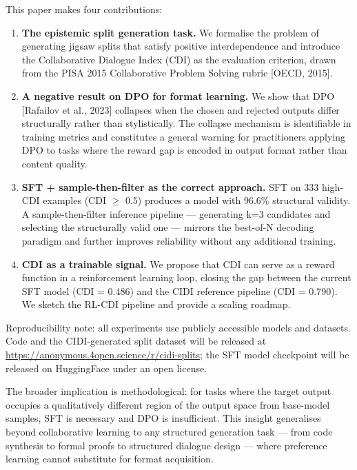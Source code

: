 \documentclass[
  11pt,
]{article}
\begin{document}
This paper makes four contributions:

\begin{enumerate}
\def\labelenumi{\arabic{enumi}.}
\item
  \textbf{The epistemic split generation task.} We formalise the problem
  of generating jigsaw splits that satisfy positive interdependence and
  introduce the Collaborative Dialogue Index (CDI) as the evaluation
  criterion, drawn from the PISA 2015 Collaborative Problem Solving
  rubric {[}OECD, 2015{]}.
\item
  \textbf{A negative result on DPO for format learning.} We show that
  DPO {[}Rafailov et al., 2023{]} collapses when the chosen and rejected
  outputs differ structurally rather than stylistically. The collapse
  mechanism is identifiable in training metrics and constitutes a
  general warning for practitioners applying DPO to tasks where the
  reward gap is encoded in output format rather than content quality.
\item
  \textbf{SFT + sample-then-filter as the correct approach.} SFT on 333
  high-CDI examples (CDI $\geq$ 0.5) produces a model with 96.6\% structural
  validity. A sample-then-filter inference pipeline --- generating k=3
  candidates and selecting the structurally valid one --- mirrors the
  best-of-N decoding paradigm and further improves reliability without
  any additional training.
\item
  \textbf{CDI as a trainable signal.} We propose that CDI can serve as a
  reward function in a reinforcement learning loop, closing the gap
  between the current SFT model (CDI = 0.486) and the CIDI reference
  pipeline (CDI = 0.790). We sketch the RL-CDI pipeline and provide a
  scaling roadmap.
\end{enumerate}

Reproducibility note: all experiments use publicly accessible models and datasets. Code and the CIDI-generated split dataset will be released at \url{https://anonymous.4open.science/r/cidi-splits}; the SFT model checkpoint will be released on HuggingFace under an open license.

The broader implication is methodological: for tasks where the target
output occupies a qualitatively different region of the output space
from base-model samples, SFT is necessary and DPO is insufficient. This
insight generalises beyond collaborative learning to any structured
generation task --- from code synthesis to formal proofs to structured
dialogue design --- where preference learning cannot substitute for
format acquisition.
\end{document}
